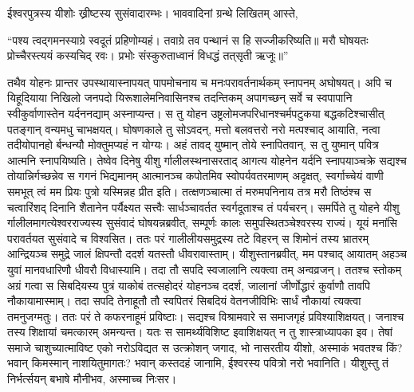 \adhyAya
{}
\vakya ईश्वरपुत्रस्य यीशोः ख्रीष्टस्य सुसंवादारम्भः। भाववादिनां ग्रन्थे लिखितम् आस्ते,
\begin{poem}
\startwithvakya “पश्य त्वद्गमनस्याग्रे स्वदूतं प्रहिणोम्यहं।
\pline तवाग्रे तव पन्थानं स हि सज्जीकरिष्यति॥
\vakya मरौ घोषयतः प्रोच्चैरस्त्ययं कस्यचिद् रवः।
\pline प्रभोः संस्कुरुताध्वानं विधद्धं तत्‌सृती ऋजूः॥”
\end{poem}
\vakya तथैव योहनः प्रान्तर उपस्थायास्नापयत् पापमोचनाय च मनःपरावर्तनार्थकम् स्नापनम् अघोषयत्।
\vakya अपि च यिहूदियाया निखिलो जनपदो यिरूशालेमनिवासिनश्च तदन्तिकम् अपागच्छन् सर्वे च स्वपापानि स्वीकुर्वाणास्तेन यर्दननद्याम् अस्नाप्यन्त।
\vakya स तु योहन उष्ट्रलोमजपरिधानश्चर्मपटुकया बद्धकटिश्चासीत् पतङ्गान् वन्यमधु चाभक्षयत्।
\vakya घोषणकाले तु सोऽवदन्, मत्तो बलवत्तरो नरो मत्पश्चाद् आयाति, नत्वा तदीयोपानहो र्बन्धन्यौ मोक्तुमप्यहं न योग्यः।
\vakya अहं तावद् युष्मान् तोये स्नापितवान्, स तु युष्मान् पवित्र आत्मनि स्नापयिष्यति।
\vakya तेष्वेव दिनेषु यीशु र्गालीलस्थनासरताद् आगत्य योहनेन यर्दनि स्नापयाञ्चक्रे
\vakya सद्यश्च तोयान्निर्गच्छन्नेव स गगनं भिद्यमानम् आत्मानञ्च कपोतमिव स्वोपर्यवतरमाणम् अदृक्षत्,
\vakya स्वर्गाच्चेयं वाणी समभूत् त्वं मम प्रियः पुत्रो यस्मिन्नह प्रीत इति।
\vakya तत्क्षणञ्चात्मा तं मरुमपनिनाय तत्र मरौ तिष्ठंश्च
\vakya स चत्वारिंशद् दिनानि शैतानेन पर्यैक्ष्यत सत्त्वैः सार्धञ्चावर्तत स्वर्गदूताश्च तं पर्यचरन्।
\vakya समर्पिते तु योहने यीशु र्गालीलमागत्येश्वरराज्यस्य सुसंवादं घोषयन्नब्रवीत्,
\vakya सम्पूर्णः कालः समुपस्थितञ्चेश्वरस्य राज्यं। यूयं मनांसि परावर्तयत सुसंवादे च विश्वसित।
\vakya ततः परं गालीलीयसमुद्रस्य तटे विहरन् स शिमोनं तस्य भ्रातरम् आन्द्रियञ्च समुद्रे जालं क्षिपन्तौ ददर्श यतस्तौ धीवरावास्ताम्।
\vakya यीशुस्तानब्रवीत्, मम पश्चाद् आयातम् अहञ्च युवां मानवधारिणौ धीवरौ विधास्यामि।
\vakya तदा तौ सपदि स्वजालानि त्यक्त्वा तम् अन्वव्रजन्।
\vakya ततश्च स्तोकम् अग्रं गत्वा स सिबदियस्य पुत्रं याकोबं तत्सहोदरं योहनञ्च ददर्श, जालानां जीर्णोद्धारं कुर्वाणौ तावपि नौकायामास्माम्।
\vakya तदा सपदि तेनाहूतौ तौ स्वपितरं सिबदियं वेतनजीविभिः सार्धं नौकायां त्यक्त्वा तमनुजग्मतुः।
\vakya ततः परं ते कफरनाहूमं प्रविष्टाः। सद्यश्च विश्रामवारे स समाजगृहं प्रविश्याशिक्षयत्।
\vakya जनाश्च तस्य शिक्षायां चमत्कारम् अमन्यन्त। यतः स सामर्थ्यविशिष्ट इवाशिक्षयत् न तु शास्त्राध्यापका इव।
\vakya तेषां समाजे चाशुच्यात्माविष्ट एको नरोऽविद्यत स उत्क्रोशन् जगाद,
\vakya भो नासरतीय यीशो, अस्माकं भवतश्च किं? भवान् किमस्मान् नाशयितुमागतः? भवान् कस्तदहं जानामि, ईश्वरस्य पवित्रो नरो भवानिति।
\vakya यीशुस्तु तं निर्भर्त्सयन् बभाषे मौनीभव, अस्माच्च निःसर।

